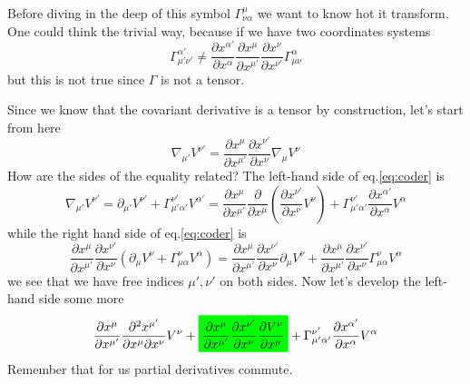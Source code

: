 Before diving in the deep of this symbol $\Gamma^{\mu }_{\nu \alpha }$ we want to know hot it transform. One could think the trivial way, because if we have two coordinates systems \[
\Gamma^{\alpha '}_{\mu '\nu '} \neq \frac{\partial x^{\alpha '}}{\partial x^{\alpha }}  \frac{\partial x^{\mu }}{\partial x^{\mu '}} \frac{\partial x^{\nu }}{\partial x^{\nu '}} \Gamma ^{\alpha }_{\mu \nu } 
\]
but this is not true since $\Gamma $ is not a tensor.\par
Since we know that the covariant derivative is a tensor by construction, let's start from here
\begin{equation}\label{eq:coder}
\nabla _{\mu '}V^{\nu '} = \frac{\partial x^{\mu }}{\partial x^{\mu '}} \frac{\partial x^{\nu '}}{\partial x^{\nu }}  \nabla _{\mu }V^{\nu }
\end{equation}
How are the sides of the equality related?
The left-hand side of eq.\ref{eq:coder} is 
\begin{equation}
\nabla _{\mu '}V^{\nu '} = \partial_{\mu '}V^{\nu '} + \Gamma ^{\nu '}_{\mu '\alpha '} V^{\alpha '} = \frac{\partial x^{\mu }}{\partial x^{\mu '}} \frac{\partial }{\partial x^{\mu }} \left( \frac{\partial x^{\nu '}}{\partial x^{\nu }} V^{\nu } \right) + \Gamma ^{\nu '}_{\mu '\alpha '} \frac{\partial x^{\alpha '}}{\partial x^{\alpha }} V^{\alpha }
\end{equation}
while the right hand side of eq.\ref{eq:coder} is 
\begin{equation}
\frac{\partial x^{\mu }}{\partial x^{\mu '}} \frac{\partial x^{\nu '}}{\partial x^{\nu }} \left( \partial_{\mu }V^{\nu } + \Gamma ^{\nu }_{\mu \alpha } V^{\alpha } \right) = \frac{\partial x^{\mu }}{\partial x^{\mu '}} \frac{\partial x^{\nu '}}{\partial x^{\nu }} \partial_{\mu }V^{\nu } + \frac{\partial x^{\mu }}{\partial x^{\mu '}} \frac{\partial x^{\nu '}}{\partial x^{\nu }} \Gamma ^{\nu }_{\mu \alpha }V^{\alpha } 
\end{equation}
we see that we have free indices $\mu ', \nu '$	on both sides.
Now let's develop the left-hand side some more
\begin{equation}
	\frac{\partial x^{\mu }}{\partial x^{\mu '}} \frac{\partial ^{2}x^{\mu '}}{\partial x^{\mu }\partial x^{\nu }} V^{\nu } + \text{\colorbox{green}{$ \frac{\partial x^{\mu }}{\partial x^{\mu '}} \frac{\partial x^{\nu '}}{\partial x^{\nu }} \frac{\partial V^{\nu }}{\partial x^{\mu }}$}} + \Gamma ^{\nu '}_{\mu '\alpha '} \frac{\partial x^{\alpha '}}{\partial x^{\alpha }}V^{\alpha }
\end{equation}
Remember that for us partial derivatives commute.\par
